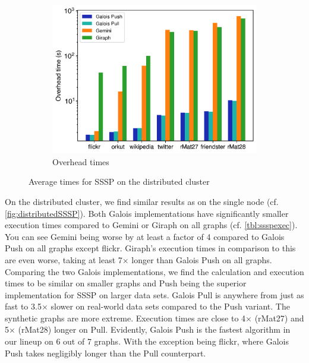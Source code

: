 \begin{figure}
\begin{subfigure}{0.32\textwidth}
		\includegraphics[width=\linewidth]{../../plots/distributedSSSP_overheadTime.png}
		\caption{Overhead times}
		\label{fig:distributedSSSP_overhead}
	\end{subfigure}
	\caption{Average times for SSSP on the distributed cluster}
	\label{fig:distributedSSSP}
\end{figure}
On the distributed cluster, we find similar results as on the single node (cf. \autoref{fig:distributedSSSP}).
Both Galois implementations have significantly smaller execution times compared to Gemini or Giraph on all graphs (cf. \autoref{tbl:ssspexec}).
You can see Gemini being worse by at least a factor of 4 compared to Galois Push on all graphs except flickr.
Giraph's execution times in comparison to this are even worse, taking at least 7$\times$ longer than Galois Push on all graphs.
Comparing the two Galois implementations, we find the calculation and execution times to be similar on smaller graphs and Push being the superior implementation for SSSP on larger data sets. Galois Pull is anywhere from just as fast to 3.5$\times$ slower on real-world data sets compared to the Push variant. The synthetic graphs are more extreme. Execution times are close to 4$\times$ (rMat27) and 5$\times$ (rMat28) longer on Pull.
Evidently, Galois Push is the fastest algorithm in our lineup on 6 out of 7 graphs. With the exception being flickr, where Galois Push takes negligibly longer than the Pull counterpart.


